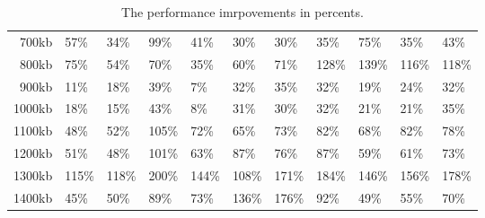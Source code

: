 \begin {table}[htpb]
\begin{tabular}{r|l|l|l|l|l|l|l|l|l|l}
700kb&57\%&34\%&99\%&41\%&30\%&30\%&35\%&75\%&35\%&43\%\\
800kb&75\%&54\%&70\%&35\%&60\%&71\%&128\%&139\%&116\%&118\%\\
900kb&11\%&18\%&39\%&7\%&32\%&35\%&32\%&19\%&24\%&32\%\\
1000kb&18\%&15\%&43\%&8\%&31\%&30\%&32\%&21\%&21\%&35\%\\
1100kb&48\%&52\%&105\%&72\%&65\%&73\%&82\%&68\%&82\%&78\%\\
1200kb&51\%&48\%&101\%&63\%&87\%&76\%&87\%&59\%&61\%&73\%\\
1300kb&115\%&118\%&200\%&144\%&108\%&171\%&184\%&146\%&156\%&178\%\\
1400kb&45\%&50\%&89\%&73\%&136\%&176\%&92\%&49\%&55\%&70\%\\
\end{tabular}
\caption{The performance imrpovements in percents.}
\label{tab:improvements-percent}
\end {table}

